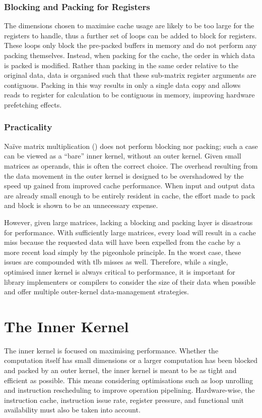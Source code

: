 \documentclass[\main/thesis.tex]{subfiles}
\begin{document}
\subsubsection{Blocking and Packing for Registers}
The dimensions chosen to maximise cache usage are likely to be too large for the registers to handle, thus a further set of loops can be added to block for registers.
These loops only block the pre-packed buffers in memory and do not perform any packing themselves.
Instead, when packing for the cache, the order in which data is packed is modified.
Rather than packing in the same order relative to the original data, data is organised such that these sub-matrix register arguments are contiguous.
Packing in this way results in only a single data copy and allows reads to register for calculation to be contiguous in memory, improving hardware prefetching effects.

\subsubsection{Practicality}
Na\"ive matrix multiplication (\ie {}) does not perform blocking nor packing; such a case can be viewed as a ``bare'' inner kernel, without an outer kernel.
Given small matrices as operands, this is often the correct choice.
The overhead resulting from the data movement in the outer kernel is designed to be overshadowed by the speed up gained from improved cache performance.
When input and output data are already small enough to be entirely resident in cache, the effort made to pack and block is shown to be an unnecessary expense.

However, given large matrices, lacking a blocking and packing layer is disastrous for performance.
With sufficiently large matrices, every load will result in a cache miss because the requested data will have been expelled from the cache by a more recent load simply by the pigeonhole principle.
In the worst case, these issues are compounded with \gls{tlb} misses as well.
Therefore, while a single, optimised inner kernel is always critical to performance, it is important for library implementers or compilers to consider the size of their data when possible and offer multiple outer-kernel data-management strategies.

\section{The Inner Kernel}
The inner kernel is focused on maximising performance.
Whether the computation itself has small dimensions or a larger computation has been blocked and packed by an outer kernel, the inner kernel is meant to be as tight and efficient as possible.
This means considering optimisations such as loop unrolling and instruction rescheduling to improve operation pipelining.
Hardware-wise, the instruction cache, instruction issue rate, register pressure, and functional unit availability must also be taken into account.
\end{document}
